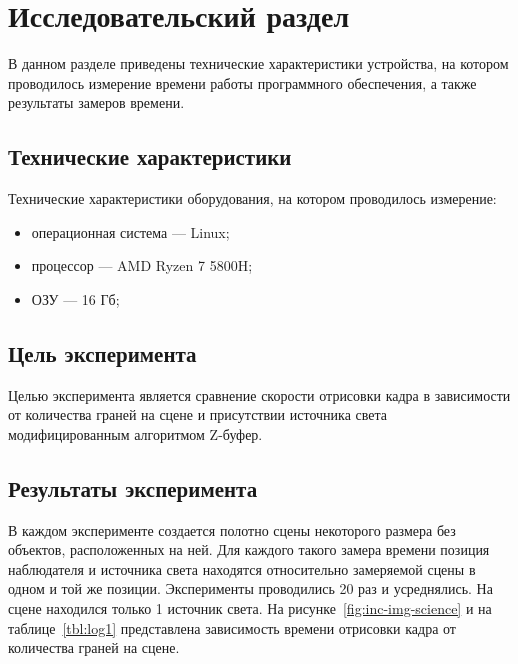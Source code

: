 \chapter{Исследовательский раздел}
В данном разделе приведены технические характеристики устройства, на
котором проводилось измерение времени работы программного обеспечения, а
также результаты замеров времени.


\section{Технические характеристики}

Технические характеристики оборудования, на котором проводилось измерение:
\begin{itemize}
    \item операционная система --- Linux;
    \item процессор --- AMD Ryzen 7 5800H;
    \item ОЗУ --- 16 Гб;
\end{itemize}


\section{Цель эксперимента}

Целью эксперимента является сравнение скорости отрисовки кадра
в зависимости от количества граней на сцене и присутствии источника света
модифицированным алгоритмом Z-буфер.

\section{Результаты эксперимента}


В каждом эксперименте создается полотно сцены некоторого размера без объектов,
расположенных на ней. Для каждого такого замера времени позиция наблюдателя
и источника света находятся относительно замеряемой сцены в одном и той же
позиции. Эксперименты проводились 20 раз и усреднялись. На сцене находился
только 1 источник света. На рисунке~\ref{fig:inc-img-science} и на таблице~\ref{tbl:log1}
представлена зависимость времени отрисовки кадра от количества граней на сцене.

